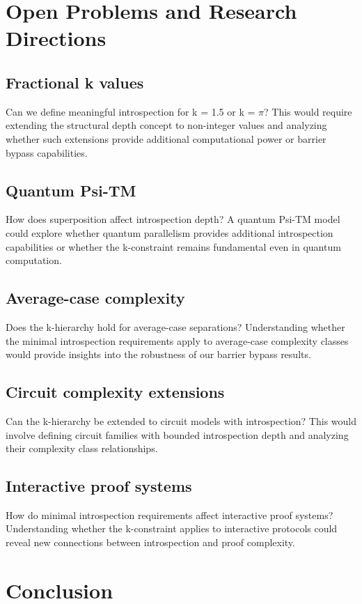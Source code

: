 \documentclass[11pt]{article}
\theoremstyle{definition}
\begin{document}
\section{Open Problems and Research Directions}

\subsection{Fractional k values}
Can we define meaningful introspection for k = 1.5 or k = $\pi$? This would require extending the structural depth concept to non-integer values and analyzing whether such extensions provide additional computational power or barrier bypass capabilities.

\subsection{Quantum Psi-TM}
How does superposition affect introspection depth? A quantum Psi-TM model could explore whether quantum parallelism provides additional introspection capabilities or whether the k-constraint remains fundamental even in quantum computation.

\subsection{Average-case complexity}
Does the k-hierarchy hold for average-case separations? Understanding whether the minimal introspection requirements apply to average-case complexity classes would provide insights into the robustness of our barrier bypass results.

\subsection{Circuit complexity extensions}
Can the k-hierarchy be extended to circuit models with introspection? This would involve defining circuit families with bounded introspection depth and analyzing their complexity class relationships.

\subsection{Interactive proof systems}
How do minimal introspection requirements affect interactive proof systems? Understanding whether the k-constraint applies to interactive protocols could reveal new connections between introspection and proof complexity.

\section{Conclusion}
\end{document}
